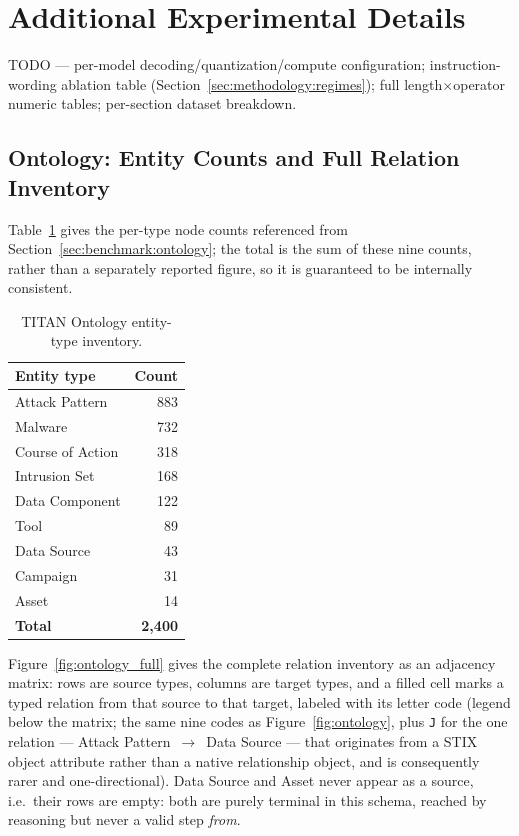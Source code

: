\section{Additional Experimental Details}
\label{sec:appendix}

TODO --- per-model decoding/quantization/compute configuration; instruction-wording ablation table (Section~\ref{sec:methodology:regimes}); full length$\times$operator numeric tables; per-section dataset breakdown.

\subsection{Ontology: Entity Counts and Full Relation Inventory}
\label{sec:appendix:ontology}

Table~\ref{tab:ontology_counts} gives the per-type node counts referenced from Section~\ref{sec:benchmark:ontology}; the total is the sum of these nine counts, rather than a separately reported figure, so it is guaranteed to be internally consistent.

\begin{table}[h]
\centering
\small
\begin{tabular}{lr}
\toprule
\textbf{Entity type} & \textbf{Count} \\
\midrule
Attack Pattern     & 883 \\
Malware             & 732 \\
Course of Action    & 318 \\
Intrusion Set        & 168 \\
Data Component       & 122 \\
Tool                 & 89 \\
Data Source          & 43 \\
Campaign             & 31 \\
Asset                & 14 \\
\midrule
\textbf{Total}       & \textbf{2{,}400} \\
\bottomrule
\end{tabular}
\caption{TITAN Ontology entity-type inventory.}
\label{tab:ontology_counts}
\end{table}

Figure~\ref{fig:ontology_full} gives the complete relation inventory as an adjacency matrix: rows are source types, columns are target types, and a filled cell marks a typed relation from that source to that target, labeled with its letter code (legend below the matrix; the same nine codes as Figure~\ref{fig:ontology}, plus \texttt{J} for the one relation --- Attack Pattern~$\to$~Data Source --- that originates from a STIX object attribute rather than a native relationship object, and is consequently rarer and one-directional). Data Source and Asset never appear as a source, i.e.\ their rows are empty: both are purely terminal in this schema, reached by reasoning but never a valid step \emph{from}.

